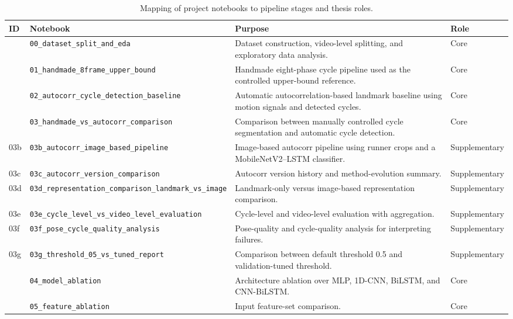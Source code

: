 \begin{table}[htbp]
\centering
\caption{Mapping of project notebooks to pipeline stages and thesis roles.}
\label{tab:notebook-mapping}
\renewcommand{\arraystretch}{1.18}
\scriptsize
\begin{tabularx}{\textwidth}{
>{\raggedright\arraybackslash}p{}
>{\raggedright\arraybackslash}p{}
>{\raggedright\arraybackslash}X
>{\raggedright\arraybackslash}p{}}
\toprule
ID & Notebook & Purpose & Role \\
\midrule
00  & \texttt{00\_dataset\_split\_and\_eda} & Dataset construction, video-level splitting, and exploratory data analysis. & Core \\
01  & \texttt{01\_handmade\_8frame\_upper\_bound} & Handmade eight-phase cycle pipeline used as the controlled upper-bound reference. & Core \\
02  & \texttt{02\_autocorr\_cycle\_detection\_baseline} & Automatic autocorrelation-based landmark baseline using motion signals and detected cycles. & Core \\
03  & \texttt{03\_handmade\_vs\_autocorr\_comparison} & Comparison between manually controlled cycle segmentation and automatic cycle detection. & Core \\
03b & \texttt{03b\_autocorr\_image\_based\_pipeline} & Image-based autocorr pipeline using runner crops and a MobileNetV2--LSTM classifier. & Supplementary \\
03c & \texttt{03c\_autocorr\_version\_comparison} & Autocorr version history and method-evolution summary. & Supplementary \\
03d & \texttt{03d\_representation\_comparison\_landmark\_vs\_image} & Landmark-only versus image-based representation comparison. & Supplementary \\
03e & \texttt{03e\_cycle\_level\_vs\_video\_level\_evaluation} & Cycle-level and video-level evaluation with aggregation. & Supplementary \\
03f & \texttt{03f\_pose\_cycle\_quality\_analysis} & Pose-quality and cycle-quality analysis for interpreting failures. & Supplementary \\
03g & \texttt{03g\_threshold\_05\_vs\_tuned\_report} & Comparison between default threshold 0.5 and validation-tuned threshold. & Supplementary \\
04  & \texttt{04\_model\_ablation} & Architecture ablation over MLP, 1D-CNN, BiLSTM, and CNN-BiLSTM. & Core \\
05  & \texttt{05\_feature\_ablation} & Input feature-set comparison. & Core \\

\end{tabularx}
\end{table}
